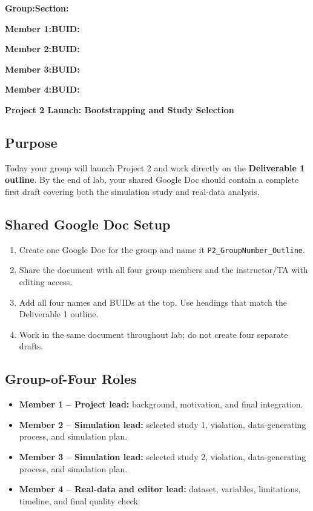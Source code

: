\documentclass{article}
\newcommand{\projecttitle}{Project 2 Launch: Bootstrapping and Study Selection}
\newcommand{\blankline}{\underline{\phantom{XXXXXXXXXXXXXXXXXXXXXXXX}}}
\newcommand{\blankid}{\underline{\phantom{XXXXXXXXXXXXXXX}}}
\begin{document}
\noindent\textbf{Group:}\blankline{}\hfill\textbf{Section:}\blankid{}

\medskip
\noindent\textbf{Member 1:}\blankline{}\hfill\textbf{BUID:}\blankid{}

\medskip
\noindent\textbf{Member 2:}\blankline{}\hfill\textbf{BUID:}\blankid{}

\medskip
\noindent\textbf{Member 3:}\blankline{}\hfill\textbf{BUID:}\blankid{}

\medskip
\noindent\textbf{Member 4:}\blankline{}\hfill\textbf{BUID:}\blankid{}

\begin{center}
  {\Large \textbf{\projecttitle{}}}
\end{center}

\subsection*{Purpose}
Today your group will launch Project 2 and work directly on the \textbf{Deliverable 1 outline}. By the end of lab, your shared Google Doc should contain a complete first draft covering both the simulation study and real-data analysis.

\subsection*{Shared Google Doc Setup}
\begin{enumerate}[itemsep=.25em]
  \item Create one Google Doc for the group and name it \texttt{P2\_GroupNumber\_Outline}.
  \item Share the document with all four group members and the instructor/TA with editing access.
  \item Add all four names and BUIDs at the top. Use headings that match the Deliverable 1 outline.
  \item Work in the same document throughout lab; do not create four separate drafts.
\end{enumerate}

\subsection*{Group-of-Four Roles}
\begin{itemize}[itemsep=.25em]
  \item \textbf{Member 1 -- Project lead:} background, motivation, and final integration.
  \item \textbf{Member 2 -- Simulation lead:} selected study 1, violation, data-generating process, and simulation plan.
  \item \textbf{Member 3 -- Simulation lead:} selected study 2, violation, data-generating process, and simulation plan.
  \item \textbf{Member 4 -- Real-data and editor lead:} dataset, variables, limitations, timeline, and final quality check.
\end{itemize}
\end{document}
